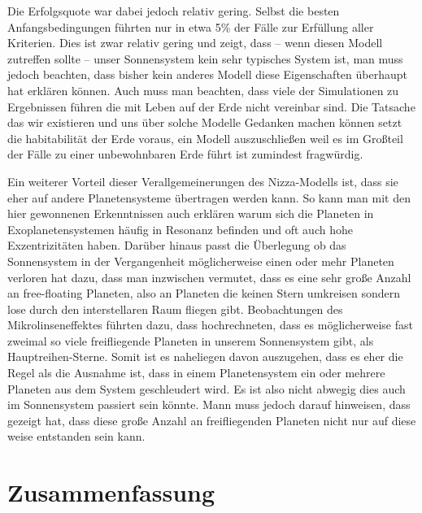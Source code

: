 \documentclass[12pt,a4paper,twoside]{article}
\renewcommand{\cite}{\citep}
\begin{document}
Die Erfolgsquote war dabei jedoch relativ gering. Selbst die besten Anfangsbedingungen führten nur in etwa 5\% der Fälle zur Erfüllung aller Kriterien\cite{Nesvorny2012}. Dies ist zwar relativ gering und zeigt, dass -- wenn diesen Modell zutreffen sollte -- unser Sonnensystem kein sehr typisches System ist, man muss jedoch beachten, dass bisher kein anderes Modell diese Eigenschaften überhaupt hat erklären können.
Auch muss man beachten, dass viele der Simulationen zu Ergebnissen führen die mit Leben auf der Erde nicht vereinbar sind. Die Tatsache das wir existieren und uns über solche Modelle Gedanken machen können setzt die habitabilität der Erde voraus, ein Modell auszuschließen weil es im Großteil der Fälle zu einer unbewohnbaren Erde führt ist zumindest fragwürdig\cite{Brasser2009}.

Ein weiterer Vorteil dieser Verallgemeinerungen des Nizza-Modells ist, dass sie eher auf andere Planetensysteme übertragen werden kann. So kann man mit den hier gewonnenen Erkenntnissen auch erklären warum sich die Planeten in Exoplanetensystemen häufig in Resonanz befinden und oft auch hohe Exzentrizitäten haben\cite{Weidenschilling1996,Rasio1996,Marcy2001,Nesvorny2012}.
Darüber hinaus passt die Überlegung ob das Sonnensystem in der Vergangenheit möglicherweise einen oder mehr Planeten verloren hat dazu, dass man inzwischen vermutet, dass es eine sehr große Anzahl an free-floating Planeten, also an Planeten die keinen Stern umkreisen sondern lose durch den interstellaren Raum fliegen gibt. %
Beobachtungen des Mikrolinseneffektes führten dazu, dass \cite{Sumi2011} hochrechneten, dass es möglicherweise fast zweimal so viele freifliegende Planeten in unserem Sonnensystem gibt, als Hauptreihen-Sterne. %
Somit ist es naheliegen davon auszugehen, dass es eher die Regel als die Ausnahme ist, dass in einem Planetensystem ein oder mehrere Planeten aus dem System geschleudert wird. Es ist also nicht abwegig dies auch im Sonnensystem passiert sein könnte.
Mann muss jedoch darauf hinweisen, dass \cite{Veras2012} gezeigt hat, dass diese große Anzahl an freifliegenden Planeten nicht nur auf diese weise entstanden sein kann.

\section{Zusammenfassung}

\end{document}
